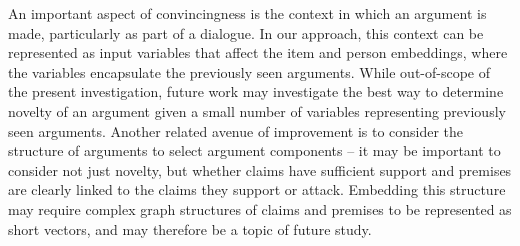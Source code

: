 An important aspect of convincingness is the context in which an argument is made, particularly
as part of a dialogue. 
In our approach, this context can be represented as input variables that affect the item and person embeddings, where the variables encapsulate the previously seen arguments.
While out-of-scope of the present investigation, future work may investigate the best way to
determine novelty of an argument given a small number of variables representing previously seen arguments.
Another related avenue of improvement is to consider the structure of arguments to select 
argument components -- it may be important to consider not just novelty, but whether claims have 
sufficient support and premises are clearly linked to the claims they support or attack. 
Embedding this structure may require complex graph structures of claims and premises to be represented
as short vectors, and may therefore be a topic of future study. 





